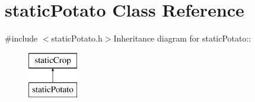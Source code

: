 \hypertarget{classstatic_potato}{
\section{staticPotato Class Reference}
\label{classstatic_potato}
}


{\ttfamily \#include $<$staticPotato.h$>$}Inheritance diagram for staticPotato::\begin{figure}[H]
\begin{center}
\leavevmode
\includegraphics[height=2cm]{classstatic_potato}
\end{center}
\end{figure}
